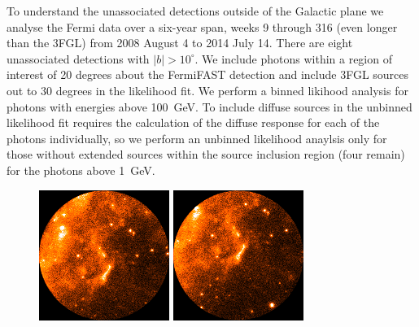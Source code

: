 \documentclass[useAMS,usenatbib]{mn2e}
\begin{document}
To understand the unassociated detections outside of the Galactic plane
we analyse the Fermi data over a six-year span, weeks 9 through 316
(even longer than the 3FGL) from 2008 August 4 to 2014 July 14. There
are eight unassociated detections with $|b|>10^{\circ}$.  We
include photons within a region of interest of 20 degrees about the
FermiFAST detection and include 3FGL sources out to 30 degrees in the
likelihood fit. We perform a binned likihood analysis for photons with
energies above 100~GeV.  To include diffuse sources in the unbinned
likelihood fit requires the calculation of the diffuse response for
each of the photons individually, so we perform an unbinned likelihood
anaylsis only for those without extended sources within the source
inclusion region (four remain) for the photons above 1~GeV.
\begin{figure}
  \includegraphics[width=0.45\columnwidth]{src_18_1GeV}
  \includegraphics[width=0.45\columnwidth]{src_20_1GeV}


\end{figure}
\end{document}
